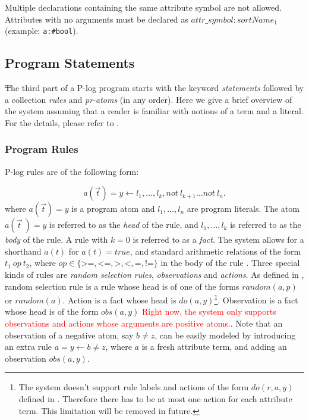 \documentclass[12pt, letterpaper]{article}
\begin{document}
Multiple declarations containing the same attribute symbol are not allowed.
Attributes with no arguments must be declared as $attr\_symbol:sortName_1$ (example: \texttt{a:\#bool}).


\subsection{Program Statements}

\st The third part of a P-log program starts with the keyword \textit{statements} followed by a collection \textit{rules} and \textit{pr-atoms} (in any order). Here we give a brief overview of the system assuming that a reader is familiar with notions of a term and a literal. For the details, please refer to \cite{Balai2019}. 

\subsubsection{Program Rules}
P-log rules are of the following form:

\begin{equation}
   a(\vec{t}) = y \leftarrow l_1,  \ldots, l_k, not~l_{k+1} \ldots not~l_{n}.
 \end{equation}
where $a(\vec{t}) = y$ is a program atom and $l_1,\ldots,l_n$ are program literals.
The atom $a(\vec{t}~) = y$ is referred to as the \textit{head} of the rule, and $l_1,\ldots,l_k$ is referred to as the \textit{body} of the rule.
 A rule with $k=0$ is referred to as a \textit{fact}.
 The system allows for a shorthand $a(t)$ for $a(t) = true$, and standard arithmetic relations of the form $t_1~op~t_2$, where $op \in \{\texttt{>=},\texttt{<=},\texttt{>},\texttt{<},\texttt{=},\texttt{!=}\}$ in the body of the rule .
 Three special kinds of rules are \textit{random selection rules}, \textit{observations} and \textit{actions}.
 As defined in \cite{Balai2019},
 random selection rule is a rule whose head is of one of the forms $random(a,p)$ or $random(a)$. Action is a fact whose head is $do(a,y)$\footnote{The system doesn't support rule labels and actions of the form $do(r,a,y)$ defined in \cite{Balai2019}. Therefore there has to be at most one action for each attribute term. This limitation will be removed in future.}.
 Observation is a fact whose head is of the form $obs(a,y)$ \textcolor{red}{Right now, the system only supports observations and actions whose arguments are positive atoms.}. Note that an observation of a negative atom, say $b \not= z$, can be easily modeled by introducing an extra rule $a = y \leftarrow b \not=z$, where $a$ is a fresh attribute term, and adding an observation $obs(a,y)$. 
 
\end{document}
